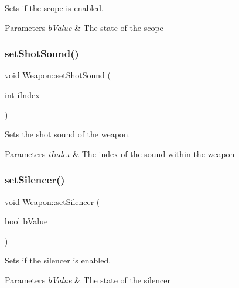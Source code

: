 Sets if the scope is enabled. 


\begin{DoxyParams}{Parameters}
{\em b\+Value} & The state of the scope \\
\hline
\end{DoxyParams}
\mbox{\label{class_weapon_afef061744cc1013fa5e5f06a7573431e}} 
\subsubsection{\texorpdfstring{set\+Shot\+Sound()}{setShotSound()}}
{\footnotesize\ttfamily void Weapon\+::set\+Shot\+Sound (\begin{DoxyParamCaption}\item[{int}]{i\+Index }\end{DoxyParamCaption})}



Sets the shot sound of the weapon. 


\begin{DoxyParams}{Parameters}
{\em i\+Index} & The index of the sound within the weapon \\
\hline
\end{DoxyParams}
\mbox{\label{class_weapon_ae071c6ea456c6a9f121e434ce7d57162}} 
\subsubsection{\texorpdfstring{set\+Silencer()}{setSilencer()}}
{\footnotesize\ttfamily void Weapon\+::set\+Silencer (\begin{DoxyParamCaption}\item[{bool}]{b\+Value }\end{DoxyParamCaption})}



Sets if the silencer is enabled. 


\begin{DoxyParams}{Parameters}
{\em b\+Value} & The state of the silencer \\
\hline
\end{DoxyParams}
\mbox{\label{class_weapon_a9a2ff18fd4086fc1e0dbe1d98bcf16db}} 
